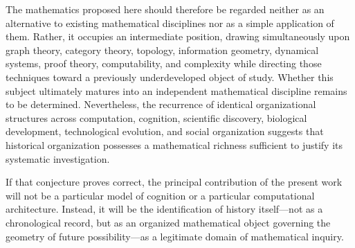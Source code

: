 \documentclass[12pt,oneside]{article}
\theoremstyle{remark}
\begin{document}
The mathematics proposed here should therefore be regarded neither as an
alternative to existing mathematical disciplines nor as a simple application of
them. Rather, it occupies an intermediate position, drawing simultaneously upon
graph theory, category theory, topology, information geometry, dynamical
systems, proof theory, computability, and complexity while directing those
techniques toward a previously underdeveloped object of study. Whether this
subject ultimately matures into an independent mathematical discipline remains
to be determined. Nevertheless, the recurrence of identical organizational
structures across computation, cognition, scientific discovery, biological
development, technological evolution, and social organization suggests that
historical organization possesses a mathematical richness sufficient to justify
its systematic investigation.

If that conjecture proves correct, the principal contribution of the present
work will not be a particular model of cognition or a particular computational
architecture. Instead, it will be the identification of history itself—not as a
chronological record, but as an organized mathematical object governing the
geometry of future possibility—as a legitimate domain of mathematical inquiry.

\newpage
\end{document}
